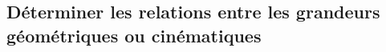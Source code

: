 \subsection{Déterminer les relations entre les grandeurs géométriques ou cinématiques}

\renewcommand{\repExo}{../../ExercicesCompetences/C2_MettreEnOeuvreDemarche/C2_06_Transmetteurs}

\renewcommand{\td}{21_TrainSimple}
\graphicspath{{\repStyle/png/}{\repExo/\td/images/}}


\renewcommand{\td}{22_TrainSimple}
\graphicspath{{\repStyle/png/}{\repExo/\td/images/}}


\renewcommand{\td}{23_TrainSimple}
\graphicspath{{\repStyle/png/}{\repExo/\td/images/}}


\renewcommand{\td}{24_TrainSimple}
\graphicspath{{\repStyle/png/}{\repExo/\td/images/}}


\renewcommand{\td}{25_Cheville}
\graphicspath{{\repStyle/png/}{\repExo/\td/images/}}


\renewcommand{\td}{26_RoueMotrice}
\graphicspath{{\repStyle/png/}{\repExo/\td/images/}}

